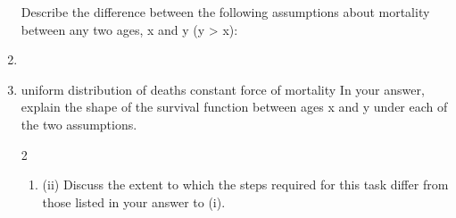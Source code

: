 \documentclass[a4paper,12pt]{article}
\begin{document}
\begin{enumerate}
Describe the difference between the following assumptions about mortality between
any two ages, x and y (y > x):
\item
\item
uniform distribution of deaths
constant force of mortality
In your answer, explain the shape of the survival function between ages x and y under
each of the two assumptions.

2
\begin{enumerate}
(i)
List the key steps in constructing a new actuarial model.

You work for an actuarial consultancy which is taking over responsibility for a
modelling process which has previously been conducted in house by a client.
3
\item (ii) Discuss the extent to which the steps required for this task differ from those
listed in your answer to (i).
\end{enumerate}




\end{enumerate}
\end{document}
